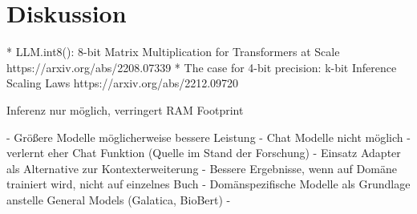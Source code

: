 \chapter{Diskussion}\label{ch:discussion}

* LLM.int8(): 8-bit Matrix Multiplication for Transformers at Scale https://arxiv.org/abs/2208.07339
* The case for 4-bit precision: k-bit Inference Scaling Laws https://arxiv.org/abs/2212.09720

Inferenz nur möglich, verringert RAM Footprint

- Größere Modelle möglicherweise bessere Leistung
- Chat Modelle nicht möglich - verlernt eher Chat Funktion (Quelle im Stand der Forschung)
- Einsatz Adapter als Alternative zur Kontexterweiterung
- Bessere Ergebnisse, wenn auf Domäne trainiert wird, nicht auf einzelnes Buch
- Domänspezifische Modelle als Grundlage anstelle General Models (Galatica, BioBert)
- 